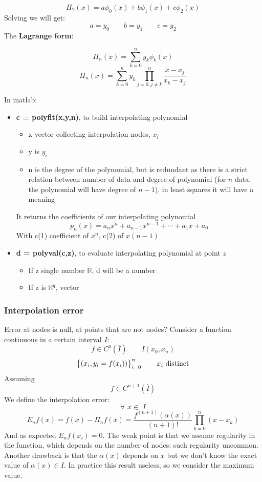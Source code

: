     $$
    \Pi_2(x)=a\phi_0(x)+b\phi_1(x)+c\phi_2(x)
    $$
    Solving we will get:
    $$
    a=y_0\qquad b=y_1\qquad c=y_2
    $$
    The \textbf{Lagrange form}:
    \begin{LARGE}
        $$
        \Pi_n(x)=\sum_{k=0}^ny_k\phi_k(x)
        $$
        $$
        \Pi_n(x)=\sum_{k=0}^ny_k\prod_{j=0,j\neq k}^n
        \frac{
            x-x_j
        }{
            x_k-x_j
        }
        $$
    \end{LARGE}
    In matlab:
    \begin{itemize}
        \item \textbf{c = polyfit(x,y,n)}, to build interpolating polynomial
        \begin{itemize}
            \item x vector collecting interpolation nodes, $x_i$
            \item y is $y_i$
            \item n is the degree of the polynomial, but is redundant as there is a strict relation between number of data and degree of polynomial (for $n$ data, the polynomial will have degree of $n-1$), in least squares it will have a meaning
        \end{itemize}
        It returns the coefficients of our interpolating polynomial
        $$
        p_n(x)=a_nx^n+a_{n-1}x^{n-1}+\cdots+a_1x+a_0
        $$
        With c(1) coefficient of $x^n$, c(2) of $x(n-1)$
        \item \textbf{d = polyval(c,z)}, to evaluate interpolating polynomial at point $z$
        \begin{itemize}
            \item If z single number $\mathbb{R}$, d will be a number
            \item If z is $\mathbb{R}^q$, vector
        \end{itemize}
    \end{itemize}

    \subsubsection{Interpolation error}
    Error at nodes is null, at points that are not nodes? Consider a function continuous in a certain interval $I$:
    $$
    f\in C^0(\overline{I})\qquad I (x_0,x_n)
    $$
    $$
    \begin{Bmatrix} {(x_i,y_i=f(x_i))} \end{Bmatrix}^n_{i=0}\qquad x_i\text{ distinct}
    $$
    Assuming
    $$
    f\in C^{n+1}(\overline{I})
    $$
    We define the interpolation error:
    $$
    \forall\,\,x\in\,\,I
    $$
    $$
    E_nf(x)=f(x)-\Pi_nf(x)=\frac{
        f^{(n+1)}\left(\alpha(x)\right)
    }{
        (n+1)!
    }\prod_{k=0}^n (x-x_k)
    $$
    And as expected $E_nf(x_i)=0$. The weak point is that we assume regularity in the function, which depends on the number of nodes: such regularity uncommon. Another drawback is that the $\alpha(x)$ depends on $x$ but we don't know the exact value of $\alpha(x)\in I$. In practice this result useless, so we consider the maximum value.

